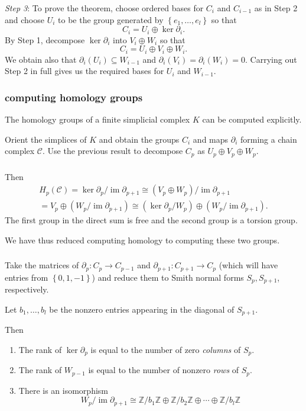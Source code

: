 \documentclass{beamer}
\newcommand{\cbr}[1]{\left\{#1\right\}}
\DeclareMathOperator{\im}{im}
\begin{document}
\begin{frame}
  \frametitle{}

  \textit{Step 3}: To prove the theorem, choose ordered bases for $C_i$ and $C_{i-1}$ as in Step 2 and choose $U_i$ to be the group generated by $\cbr{e_1,\dots,e_l}$ so that \[C_i = U_i\oplus \ker\partial_i.\] By Step 1, decompose $\ker\partial_i$ into $V_i\oplus W_i$ so that \[C_i = U_i\oplus V_i\oplus W_i.\] We obtain also that $\partial_i(U_i)\subseteq W_{i-1}$ and $\partial_i(V_i) = \partial_i(W_i) = 0$. Carrying out Step 2 in full gives us the required bases for $U_i$ and $W_{i-1}$.

\end{frame}

\begin{frame}
  \frametitle{computing homology groups}

  The homology groups of a finite simplicial complex $K$ can be computed explicitly.

  Orient the simplices of $K$ and obtain the groups $C_i$ and maps $\partial_i$ forming a chain complex $\mathcal{C}$. Use the previous result to decompose $C_p$ as $U_p\oplus V_p \oplus W_p$.

\end{frame}

\begin{frame}
  \frametitle{}

  Then\begin{multline*}
    H_p(\mathcal{C}) = \ker\partial_p/\im\partial_{p+1} \cong (V_p\oplus W_p)/\im\partial_{p+1} \\= V_p\oplus (W_p/\im\partial_{p+1})\cong (\ker\partial_p/W_p)\oplus(W_p/\im\partial_{p+1}).
  \end{multline*} The first group in the direct sum is free and the second group is a torsion group.

  We have thus reduced computing homology to computing these two groups.

\end{frame}

\begin{frame}
  \frametitle{}

  Take the matrices of $\partial_p\colon C_p\to C_{p-1}$ and $\partial_{p+1}\colon C_{p+1}\to C_p$ (which will have entries from $\cbr{0,1,-1}$) and reduce them to Smith normal forms $S_p,S_{p+1}$, respectively.
  
  Let $b_1,\dots,b_l$ be the nonzero entries appearing in the diagonal of $S_{p+1}$.

  Then \begin{enumerate}
    \item The rank of $\ker\partial_p$ is equal to the number of zero \textit{columns} of $S_p$.
    \item The rank of $W_{p-1}$ is equal to the number of nonzero \textit{rows} of $S_p$.
    \item There is an isomorphism \[W_p/\im\partial_{p+1}\cong \mathbb{Z}/b_1\mathbb{Z}\oplus\mathbb{Z}/b_2\mathbb{Z}\oplus\cdots\oplus\mathbb{Z}/b_l\mathbb{Z}\]
  \end{enumerate}

\end{frame}
\end{document}
